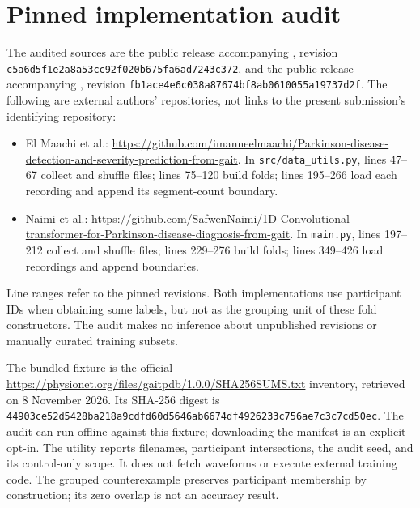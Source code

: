 \section{Pinned implementation audit}
\label{app:audit}
The audited sources are the public release accompanying \citet{elmaachi2020}, revision \texttt{c5a6d5f1e2a8a53cc92f020b675fa6ad7243c372}, and the public release accompanying \citet{naimi2024}, revision \texttt{fb1ace4e6c038a87674bf8ab0610055a19737d2f}. The following are external authors' repositories, not links to the present submission's identifying repository:
\begin{itemize}
\item El Maachi et al.: \url{https://github.com/imanneelmaachi/Parkinson-disease-detection-and-severity-prediction-from-gait}. In \texttt{src/data\_utils.py}, lines 47--67 collect and shuffle files; lines 75--120 build folds; lines 195--266 load each recording and append its segment-count boundary.
\item Naimi et al.: \url{https://github.com/SafwenNaimi/1D-Convolutional-transformer-for-Parkinson-disease-diagnosis-from-gait}. In \texttt{main.py}, lines 197--212 collect and shuffle files; lines 229--276 build folds; lines 349--426 load recordings and append boundaries.
\end{itemize}
Line ranges refer to the pinned revisions. Both implementations use participant IDs when obtaining some labels, but not as the grouping unit of these fold constructors. The audit makes no inference about unpublished revisions or manually curated training subsets.

The bundled fixture is the official \url{https://physionet.org/files/gaitpdb/1.0.0/SHA256SUMS.txt} inventory, retrieved on 8 November 2026. Its SHA-256 digest is \nolinkurl{44903ce52d5428ba218a9cdfd60d5646ab6674df4926233c756ae7c3c7cd50ec}. The audit can run offline against this fixture; downloading the manifest is an explicit opt-in. The utility reports filenames, participant intersections, the audit seed, and its control-only scope. It does not fetch waveforms or execute external training code. The grouped counterexample preserves participant membership by construction; its zero overlap is not an accuracy result.

\clearpage
